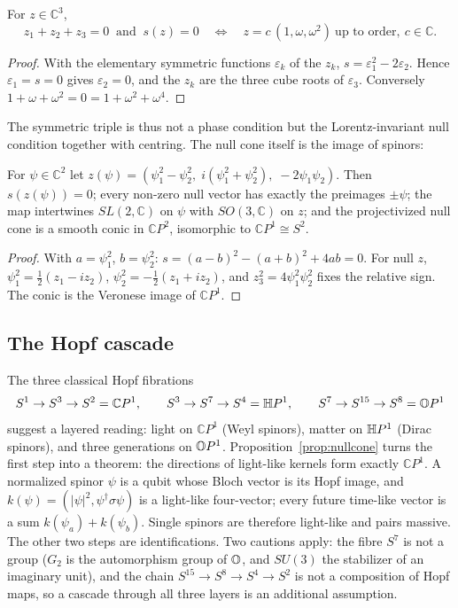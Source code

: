 \begin{lemma}\label{lem:triple}
For \(z\in\mathbb C^3\),
\[
z_1+z_2+z_3=0\ \text{ and }\ s(z)=0
\quad\Longleftrightarrow\quad
z=c\,(1,\omega,\omega^2)\ \text{up to order},\ c\in\mathbb C .
\]
\end{lemma}

\begin{proof}
With the elementary symmetric functions \(\varepsilon_k\) of the \(z_k\), \(s=\varepsilon_1^2-2\varepsilon_2\).  Hence \(\varepsilon_1=s=0\) gives
\(\varepsilon_2=0\), and the \(z_k\) are the three cube roots of \(\varepsilon_3\).  Conversely \(1+\omega+\omega^2=0=1+\omega^2+\omega^4\).
\end{proof}

The symmetric triple is thus not a phase condition but the Lorentz-invariant null condition together with centring.  The null cone
itself is the image of spinors:

\begin{proposition}\label{prop:nullcone}
For \(\psi\in\mathbb C^2\) let \(z(\psi)=(\psi_1^2-\psi_2^2,\;i(\psi_1^2+\psi_2^2),\;-2\psi_1\psi_2)\).  Then \(s(z(\psi))=0\); every non-zero null
vector has exactly the preimages \(\pm\psi\); the map intertwines \(SL(2,\mathbb C)\) on \(\psi\) with \(SO(3,\mathbb C)\) on \(z\); and the
projectivized null cone is a smooth conic in \(\mathbb CP^2\), isomorphic to \(\mathbb CP^1\cong S^2\).
\end{proposition}

\begin{proof}
With \(a=\psi_1^2\), \(b=\psi_2^2\): \(s=(a-b)^2-(a+b)^2+4ab=0\).  For null \(z\), \(\psi_1^2=\tfrac12(z_1-iz_2)\), \(\psi_2^2=-\tfrac12(z_1+iz_2)\),
and \(z_3^2=4\psi_1^2\psi_2^2\) fixes the relative sign.  The conic is the Veronese image of \(\mathbb CP^1\).
\end{proof}

\subsection{The Hopf cascade}

The three classical Hopf fibrations~\cite{hopf1931,hopf1935}
\[
S^1\to S^3\to S^2=\mathbb CP^1,\qquad S^3\to S^7\to S^4=\mathbb H P^1,\qquad S^7\to S^{15}\to S^8=\mathbb O P^1
\]
suggest a layered reading: light on \(\mathbb CP^1\) (Weyl spinors), matter on \(\mathbb H P^1\) (Dirac spinors), and three generations on
\(\mathbb O P^1\).  Proposition~\ref{prop:nullcone} turns the first step into a theorem: the directions of light-like kernels form exactly
\(\mathbb CP^1\).  A normalized spinor \(\psi\) is a qubit whose Bloch vector is its Hopf image, and \(k(\psi)=(|\psi|^2,\psi^\dagger\sigma\psi)\)
is a light-like four-vector; every future time-like vector is a sum \(k(\psi_a)+k(\psi_b)\).  Single spinors are therefore light-like and
pairs massive.  The other two steps are identifications.  Two cautions apply: the fibre \(S^7\) is not a group (\(G_2\) is the automorphism group
of \(\mathbb O\), and \(SU(3)\) the stabilizer of an imaginary unit), and the chain \(S^{15}\to S^8\to S^4\to S^2\) is not a composition of Hopf maps,
so a cascade through all three layers is an additional assumption.
